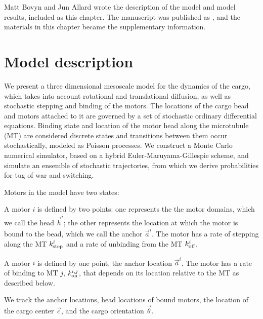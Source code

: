 Matt Bovyn and Jun Allard wrote the description of the model and model results, included as this chapter. The manuscript was published as \cite{Bergman2018}, and the materials in this chapter became the supplementary information.

\section{Model description} \label{description}

We present a three dimensional mesoscale model for the dynamics of the cargo, which takes into account rotational and translational diffusion, as well as stochastic stepping and binding of the motors. The locations of the cargo bead and motors attached to it are governed by a set of stochastic ordinary differential equations. Binding state and location of the motor head along the microtubule (MT) are considered discrete states and transitions between them occur stochastically, modeled as Poisson processes. We construct a Monte Carlo numerical simulator, based on a hybrid Euler-Maruyama-Gillespie scheme, and simulate an ensemble of stochastic trajectories, from which we  derive probabilities for tug of war and switching.

Motors in the model have two states:
\begin{description}[labelindent=\parindent,font=\normalfont]
\item[Bound:] A motor $i$ is defined by two points: one represents the the motor domains, which we call the head $\vec{h}^i$; the other represents the location at which the motor is bound to the bead, which we call the anchor $\vec{a}^i$. The motor has a rate of stepping along the MT $k_\text{step}^i$ and a rate of unbinding from the MT $k_\text{off}^i$.
\item[Unbound:] A motor $i$ is defined by one point, the anchor location $\vec{a}^i$. The motor has a rate of binding to MT $j$, $k_\text{on}^{i,j}$, that depends on its location relative to the MT as described below.
\end{description}
We track the anchor locations, head locations of bound motors, the location of the cargo center $\vec{c}$, and the cargo orientation $\vec{\theta}$.

